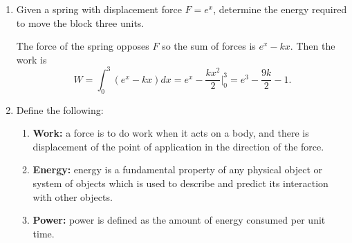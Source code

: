 \begin{enumerate}
\begin{enumerate}[label = (\alph*), ref = \theenumi{(\alph*)}]
    hanging at equilibrium has kinetic energy.
    Let the suspended bob have mass \(m_1\) and the bob hanging at
    equilibruim have mass \(m_2\).
    Then
    \begin{align*}
      m_1v_{1i} + m_2v_{2i} &= m_1v_{1f} + m_2v_{2f}\\
      m_1(v_{1i} - v_{2i}) &= m_2v_{2f}\eqnumtag\label{penmo}\\
      m_1v_{1i}^2 + m_2v_{2i}^2 &= m_1v_{1f}^2 + m_2v_{2f}^2\\
      m_1(v_{1i}^2 - v_{1f}^2) &= m_2v_{2f}^2\eqnumtag\label{penen}
    \end{align*}
    We can now divide \cref{penen} by \cref{penmo} and solve for the final
    velocities.
    \[
    v_{1i} + v_{1f} = v_{2f}
    \]
    From \cref{24a}, we have that the bobs initial velocity is
    \(v_{1i} = \sqrt{2gh}\).
    Thus, the final velocities are
    \begin{align*}
      v_{1f} &= v_{2f} - \sqrt{2gh}\\
      v_{2f} &= v_{1f} + \sqrt{2gh}
    \end{align*}
  \item
    What if the collision was non-elastic?
    \par\smallskip
    For inelastic collision, our Conservation equations become
    \begin{align*}
      m_1v_{1i} &= (m_1 + m_2)v_f\\
      m_1v_{1i}^2 &= (m_1 + m_2)v_f^2
    \end{align*}
    Then we have
    \[
    v_{1i} = v_f = \sqrt{2gh}.
    \]
  \end{enumerate}
\item
  Given a spring with displacement force \(F = e^x\), determine the energy
  required to move the block three units.
  \par\smallskip
  The force of the spring opposes \(F\) so the sum of forces is \(e^x - kx\).
  Then the work is
  \[
  W = \int_0^3(e^x - kx)dx = e^x - \frac{kx^2}{2}\big|_0^3
  = e^3 - \frac{9k}{2} - 1.
  \]
\item
  Define the following:
  \begin{enumerate}[label = (\alph*)]
  \item
    \textbf{Work:} a force is to do work when it acts on a body, and there is
    displacement of the point of application in the direction of the force.
  \item
    \textbf{Energy:} energy is a fundamental property of any physical object
    or system of objects which is used to describe and predict its interaction
    with other objects.
  \item
    \textbf{Power:} power is defined as the amount of energy consumed per unit
    time.
  \end{enumerate}
\end{enumerate}

